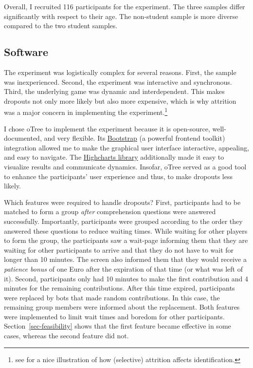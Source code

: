 \documentclass[
  authoryear,
  review,
  3p,
  onecolumn]{elsarticle}
\begin{document}
Overall, I recruited 116 participants for the experiment. The three
samples differ significantly with respect to their age. The non-student
sample is more diverse compared to the two student samples.

\hypertarget{sec-software}{%
\subsection{Software}\label{sec-software}}

The experiment was logistically complex for several reasons. First, the
sample was inexperienced. Second, the experiment was interactive and
synchronous. Third, the underlying game was dynamic and interdependent.
This makes dropouts not only more likely but also more expensive, which
is why attrition was a major concern in implementing the
experiment.\footnote{see \citet{ZhouFischbach2016} for a nice
  illustration of how (selective) attrition affects identification.}

I chose oTree \citep{oTree} to implement the experiment because it is
open-source, well-documented, and very flexible. Its
\href{https://getbootstrap.com/}{Bootstrap} (a powerful frontend
toolkit) integration allowed me to make the graphical user interface
interactive, appealing, and easy to navigate. The
\href{https://www.highcharts.com/}{Highcharts library} additionally made
it easy to visualize results and communicate dynamics. Insofar, oTree
served as a good tool to enhance the participants' user experience and
thus, to make dropouts less likely.

Which features were required to handle dropouts? First, participants had
to be matched to form a group \emph{after} comprehension questions were
answered successfully. Importantly, participants were grouped according
to the order they answered these questions to reduce waiting times.
While waiting for other players to form the group, the participants saw
a wait-page informing them that they are waiting for other participants
to arrive and that they do not have to wait for longer than 10 minutes.
The screen also informed them that they would receive a \emph{patience
bonus} of one Euro after the expiration of that time (or what was left
of it). Second, participants only had 10 minutes to make the first
contribution and 4 minutes for the remaining contributions. After this
time expired, participants were replaced by bots that made random
contributions. In this case, the remaining group members were informed
about the replacement. Both features were implemented to limit wait
times and boredom for other participants. Section~\ref{sec-feasibility}
shows that the first feature became effective in some cases, whereas the
second feature did not.
\end{document}
